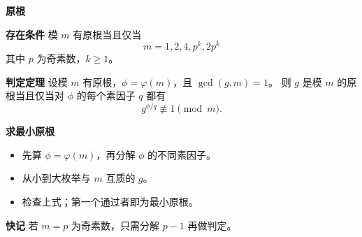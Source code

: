 \textbf{原根}

\textbf{存在条件}
模 $m$ 有原根当且仅当
\[
m=1,2,4,p^k,2p^k
\]
其中 $p$ 为奇素数，$k\ge 1$。

\textbf{判定定理}
设模 $m$ 有原根，$\phi=\varphi(m)$，且 $\gcd(g,m)=1$。
则 $g$ 是模 $m$ 的原根当且仅当对 $\phi$ 的每个素因子 $q$ 都有
\[
g^{\phi/q}\not\equiv 1\pmod m.
\]

\textbf{求最小原根}
\begin{itemize}
\item 先算 $\phi=\varphi(m)$，再分解 $\phi$ 的不同素因子。
\item 从小到大枚举与 $m$ 互质的 $g$。
\item 检查上式；第一个通过者即为最小原根。
\end{itemize}

\textbf{快记}
若 $m=p$ 为奇素数，只需分解 $p-1$ 再做判定。
